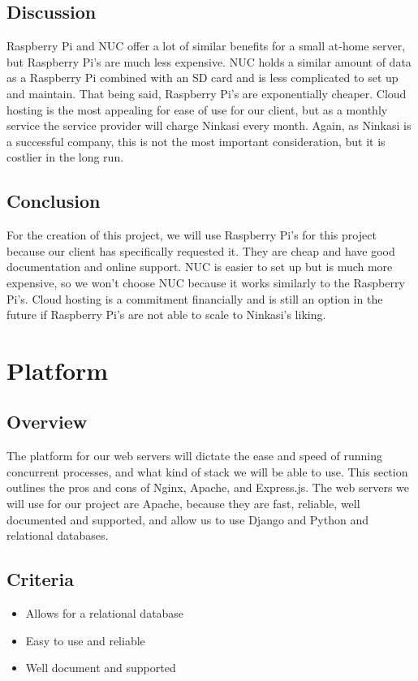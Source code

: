 \documentclass[draftclsnofoot,onecolumn,letterpaper,10pt,compsoc]{IEEEtran}
\begin{document}
			\subsection{Discussion}
				Raspberry Pi and NUC offer a lot of similar benefits for a small at-home server, but Raspberry Pi’s are much less expensive.
				NUC holds a similar amount of data as a Raspberry Pi combined with an SD card and is less complicated to set up and maintain.
				That being said, Raspberry Pi's are exponentially cheaper.
				Cloud hosting is the most appealing for ease of use for our client, but as a monthly service the service provider will charge Ninkasi every month.
				Again, as Ninkasi is a successful company, this is not the most important consideration, but it is costlier in the long run.

				\subsection{Conclusion}
				For the creation of this project, we will use Raspberry Pi’s for this project because our client has specifically requested it.
				They are cheap and have good documentation and online support.
				NUC is easier to set up but is much more expensive, so we won’t choose NUC because it works similarly to the Raspberry Pi’s.
				Cloud hosting is a commitment financially and is still an option in the future if Raspberry Pi’s are not able to scale to Ninkasi’s liking.

\section{Platform}
\subsection{Overview}
The platform for our web servers will dictate the ease and speed of running concurrent processes, and what kind of stack we will be able to use.
This section outlines the pros and cons of Nginx, Apache, and Express.js.
The web servers we will use for our project are Apache, because they are fast, reliable, well documented and supported, and allow us to use Django and Python and relational databases.
\subsection{Criteria}
\begin{itemize}
\item Allows for a relational database
\item Easy to use and reliable
\item Well document and supported
\end{itemize}
\end{document}
